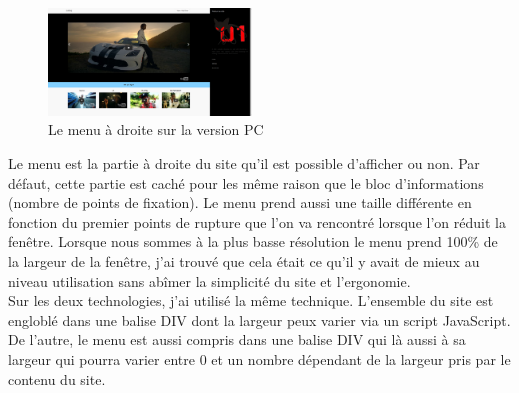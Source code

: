 \documentclass{article}
\begin{document}
\begin{figure}
  \vspace{-20pt}
  \begin{center}
    \includegraphics[width=0.48\textwidth]{p2}
  \end{center}
  \vspace{-20pt}
  \caption{Le menu \`a droite sur la version PC}
  \vspace{-10pt}
\end{figure}
Le menu est la partie \`a droite du site qu'il est possible d'afficher ou non. Par d\'efaut, cette partie est cach\'e pour les m\^eme raison que le bloc d'informations (nombre de points de fixation). Le menu prend aussi une taille diff\'erente en fonction du premier points de rupture que l'on va rencontr\'e lorsque l'on r\'eduit la fen\^etre. Lorsque nous sommes \`a la plus basse r\'esolution le menu prend 100\% de la largeur de la fen\^etre, j'ai trouv\'e que cela \'etait ce qu'il y avait de mieux au niveau utilisation sans ab\^imer la simplicit\'e du site et l'ergonomie.\\
Sur les deux technologies, j'ai utilis\'e la m\^eme technique. L'ensemble du site est englobl\'e dans une balise DIV dont la largeur peux varier via un script JavaScript. De l'autre, le menu est aussi compris dans une balise DIV qui l\`a aussi \`a sa largeur qui pourra varier entre 0 et un nombre d\'ependant de la largeur pris par le contenu du site. \\
\vspace{0.5cm}\\
\end{document}
